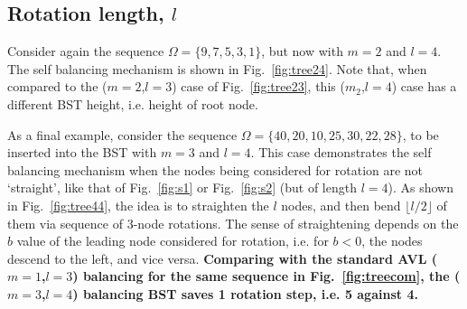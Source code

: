 \documentclass{article}
\begin{document}
\subsection{Rotation length, $l$}

Consider again the sequence $\Omega=\{9,7,5,3,1\}$, but now with $m=2$ and $l=4$. The self balancing mechanism is shown in Fig.~\ref{fig:tree24}. Note that, when compared to the ($m=2$,$l=3$) case of Fig.~\ref{fig:tree23}, this ($m_2$,$l=4$) case has a different BST height, i.e. height of root node.

\vspace{5mm}

As a final example, consider the sequence $\Omega=\{40,20,10,25,30,22,28\}$, to be inserted into the BST with $m=3$ and $l=4$. This case demonstrates the self balancing mechanism when the nodes being considered for rotation are not `straight', like that of Fig.~\ref{fig:s1} or Fig.~\ref{fig:s2} (but of length $l=4$). As shown in Fig.~\ref{fig:tree44}, the idea is to straighten the $l$ nodes, and then bend $\lfloor l/2 \rfloor$ of them via sequence of 3-node rotations. The sense of straightening depends on the $b$ value of the leading node considered for rotation, i.e. for $b<0$, the nodes descend to the left, and vice versa. \textbf{Comparing with the standard AVL ($m=1$,$l=3$) balancing for the same sequence in Fig.~\ref{fig:treecom}, the ($m=3$,$l=4$) balancing BST saves 1 rotation step, i.e. 5 against 4.}
 
\end{document}
